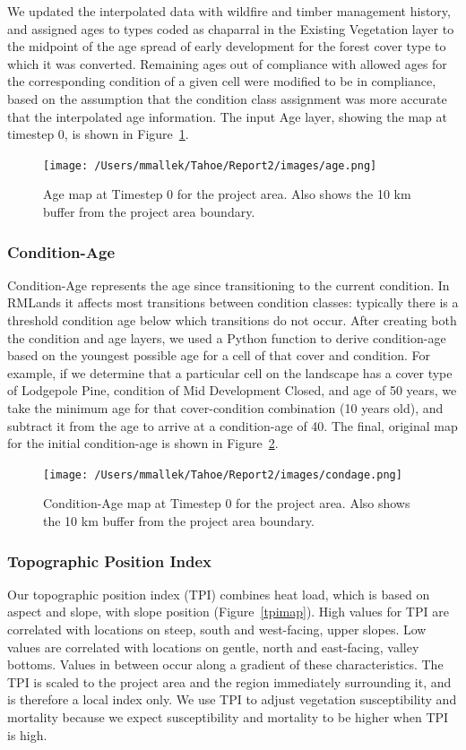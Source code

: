 We updated the interpolated data with wildfire and timber management history, and assigned ages to types coded as chaparral in the Existing Vegetation layer to the midpoint of the age spread of early development for the forest cover type to which it was converted. Remaining ages out of compliance with allowed ages for the corresponding condition of a given cell were modified to be in compliance, based on the assumption that the condition class assignment was more accurate that the interpolated age information. The input Age layer, showing the map at timestep 0, is shown in Figure~\ref{agemap}.

\begin{figure}[htbp]
\centering
\texttt{[image: /Users/mmallek/Tahoe/Report2/images/age.png]}
\caption{Age map at Timestep 0 for the project area. Also shows the 10 km buffer from the project area boundary.} 
\label{agemap}
\end{figure}

\subsubsection{Condition-Age}
Condition-Age represents the age since transitioning to the current condition. In RMLands it affects most transitions between condition classes: typically there is a threshold condition age below which transitions do not occur. After creating both the condition and age layers, we used a Python function to derive condition-age based on the youngest possible age for a cell of that cover and condition. For example, if we determine that a particular cell on the landscape has a cover type of Lodgepole Pine, condition of Mid Development Closed, and age of 50 years, we take the minimum age for that cover-condition combination (10 years old), and subtract it from the age to arrive at a condition-age of 40. The final, original map for the initial condition-age is shown in Figure~\ref{condagemap}.

\begin{figure}[htbp]
\centering
\texttt{[image: /Users/mmallek/Tahoe/Report2/images/condage.png]}
\caption{Condition-Age map at Timestep 0 for the project area. Also shows the 10 km buffer from the project area boundary.} 
\label{condagemap}
\end{figure}

\subsubsection{Topographic Position Index}
Our topographic position index (TPI) combines heat load, which is based on aspect and slope, with slope position (Figure~\ref{tpimap}). High values for TPI are correlated with locations on steep, south and west-facing, upper slopes. Low values are correlated with locations on gentle, north and east-facing, valley bottoms. Values in between occur along a gradient of these characteristics. The TPI is scaled to the project area and the region immediately surrounding it, and is therefore a local index only. We use TPI to adjust vegetation susceptibility and mortality because we expect susceptibility and mortality to be higher when TPI is high.

